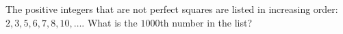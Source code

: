 The positive integers that are not perfect squares are listed in increasing order: $2,3,5,6,7,8,10,\dots$. What is the $1000$th number in the list?
